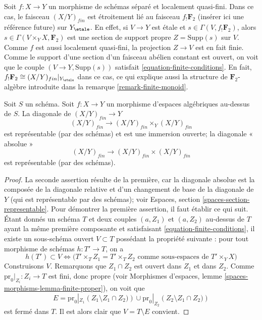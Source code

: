 \begin{remark}
\label{remark-finite-quasi-finite-separated-morphism-schemes}
Soit $f : X \to Y$ un morphisme de schémas séparé et localement
quasi-fini. Dans ce cas, le faisceau $(X/Y)_{fin}$
est étroitement lié au faisceau $f_!\mathbf{F}_2$
(insérer ici une référence future) sur $Y_\etale$.
En effet, si $V \to Y$ est étale et $s \in \Gamma(V, f_!\mathbf{F}_2)$,
alors $s \in \Gamma(V \times_Y X, \mathbf{F}_2)$ est une section
de support propre $Z = \text{Supp}(s)$ sur $V$. Comme $f$ est
aussi localement quasi-fini, la projection $Z \to V$ est en fait
finie. Comme le support d'une section d'un faisceau abélien constant est ouvert,
on voit que le couple $(V \to Y, \text{Supp}(s))$ satisfait
\ref{equation-finite-conditions}.
En fait, $f_!\mathbf{F}_2 \cong (X/Y)_{fin}|_{Y_\etale}$
dans ce cas, ce qui explique aussi la structure de $\mathbf{F}_2$-algèbre
introduite dans la remarque \ref{remark-finite-monoid}.
\end{remark}

\begin{lemma}
\label{lemma-finite-diagonal}
Soit $S$ un schéma.
Soit $f : X \to Y$ un morphisme d'espaces algébriques au-dessus de $S$.
La diagonale de $(X/Y)_{fin} \to Y$
$$
(X/Y)_{fin} \longrightarrow (X/Y)_{fin} \times_Y (X/Y)_{fin}
$$
est représentable (par des schémas) et est une immersion ouverte; la diagonale
« absolue »
$$
(X/Y)_{fin} \longrightarrow (X/Y)_{fin} \times (X/Y)_{fin}
$$
est représentable (par des schémas).
\end{lemma}

\begin{proof}
La seconde assertion résulte de la première, car la diagonale absolue
est la composée de la diagonale relative et d'un changement de base
de la diagonale de $Y$ (qui est représentable par des schémas); voir
Espaces, section \ref{spaces-section-representable}.
Pour démontrer la première assertion, il faut établir ce qui suit.
Étant donnés un schéma $T$ et deux couples $(a, Z_1)$ et $(a, Z_2)$ au-dessus de $T$
ayant la même première composante et
satisfaisant \ref{equation-finite-conditions},
il existe un sous-schéma ouvert $V \subset T$ possédant la propriété suivante :
pour tout morphisme de schémas $h : T' \to T$, on a
$$
h(T') \subset V \Leftrightarrow
\Big(T' \times_T Z_1 = T' \times_T Z_2
\text{ comme sous-espaces de }T' \times_Y X\Big)
$$
Construisons $V$. Remarquons que $Z_1 \cap Z_2$ est ouvert dans $Z_1$
et dans $Z_2$. Comme $\text{pr}_0|_{Z_i} : Z_i \to T$ est fini,
donc propre (voir
Morphismes d'espaces, lemme \ref{spaces-morphisms-lemma-finite-proper}),
on voit que
$$
E =
\text{pr}_0|_{Z_1}\left(Z_1 \setminus Z_1 \cap Z_2)\right)
\cup
\text{pr}_0|_{Z_2}\left(Z_2 \setminus Z_1 \cap Z_2)\right)
$$
est fermé dans $T$. Il est alors clair que $V = T \setminus E$ convient.
\end{proof}

